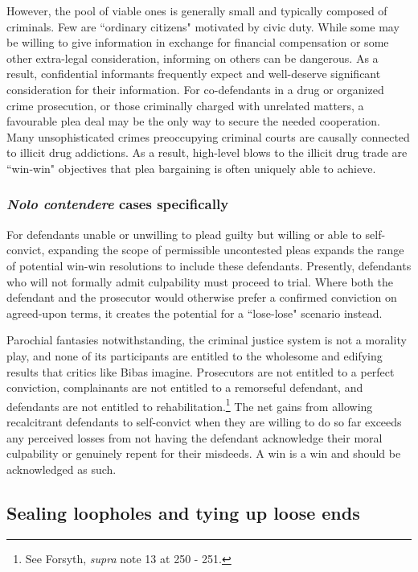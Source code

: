 However, the pool of viable ones is generally small and typically composed of criminals. Few are ``ordinary citizens" motivated by civic duty. While some may be willing to give information in exchange for financial compensation or some other extra-legal consideration, informing on others can be dangerous. As a result, confidential informants frequently expect and well-deserve significant consideration for their information. For co-defendants in a drug or organized crime prosecution, or those criminally charged with unrelated matters, a favourable plea deal may be the only way to secure the needed cooperation. Many unsophisticated crimes preoccupying criminal courts are causally connected to illicit drug addictions. As a result, high-level blows to the illicit drug trade are ``win-win" objectives that plea bargaining is often uniquely able to achieve. 

\subsubsection{\textit{Nolo contendere} cases specifically}

For defendants unable or unwilling to plead guilty but willing or able to self-convict, expanding the scope of permissible uncontested pleas expands the range of potential win-win resolutions to include these defendants. Presently, defendants who will not formally admit culpability must proceed to trial. Where both the defendant and the prosecutor would otherwise prefer a confirmed conviction on agreed-upon terms, it creates the potential for a ``lose-lose" scenario instead.

Parochial fantasies notwithstanding, the criminal justice system is not a morality play, and none of its participants are entitled to the wholesome and edifying results that critics like Bibas imagine. Prosecutors are not entitled to a perfect conviction, complainants are not entitled to a remorseful defendant, and defendants are not entitled to rehabilitation.\footnote{See Forsyth, \textit{supra} note 13 at 250 - 251.} The net gains from allowing recalcitrant defendants to self-convict when they are willing to do so far exceeds any perceived losses from not having the defendant acknowledge their moral culpability or genuinely repent for their misdeeds. A win is a win and should be acknowledged as such.

\subsection{Sealing loopholes and tying up loose ends}

